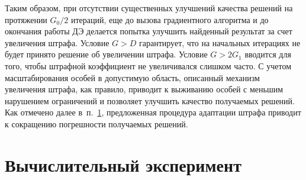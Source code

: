 Таким образом, при отсутствии существенных улучшений качества решений на протяжении $G_0/2$ итераций, еще до
вызова градиентного алгоритма и до окончания работы ДЭ делается попытка улучшить найденный результат за счет увеличения штрафа.
Условие $G > D$ гарантирует, что на начальных итерациях не будет принято решение об увеличении штрафа.
Условие $G > 2 G_1$ вводится для того, чтобы штрафной коэффициент не увеличивался слишком часто.
С учетом масштабирования особей в допустимую область, описанный механизм увеличения штрафа, как правило,
приводит к выживанию особей с меньшим нарушением ограничений и позволяет улучшить качество получаемых решений.
Как отмечено далее в~п.~\ref{sec:exp:de}, предложенная процедура адаптации штрафа приводит к сокращению погрешности получаемых решений.

\section{Вычислительный эксперимент}\label{sec:exp:de}

